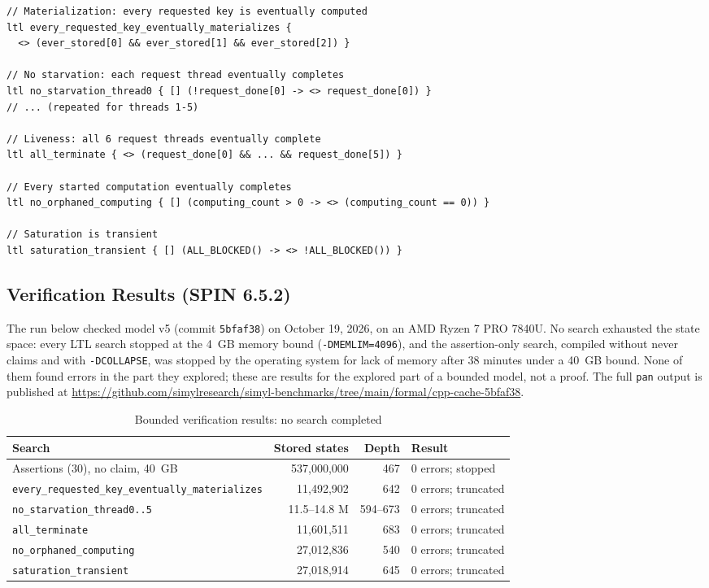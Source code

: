 \documentclass[11pt,a4paper]{article}
\begin{document}
\begin{lstlisting}[language=Promela, caption=LTL properties checked under weak fairness]
// Materialization: every requested key is eventually computed
ltl every_requested_key_eventually_materializes {
  <> (ever_stored[0] && ever_stored[1] && ever_stored[2]) }

// No starvation: each request thread eventually completes
ltl no_starvation_thread0 { [] (!request_done[0] -> <> request_done[0]) }
// ... (repeated for threads 1-5)

// Liveness: all 6 request threads eventually complete
ltl all_terminate { <> (request_done[0] && ... && request_done[5]) }

// Every started computation eventually completes
ltl no_orphaned_computing { [] (computing_count > 0 -> <> (computing_count == 0)) }

// Saturation is transient
ltl saturation_transient { [] (ALL_BLOCKED() -> <> !ALL_BLOCKED()) }
\end{lstlisting}

\subsection{Verification Results (SPIN 6.5.2)}

The run below checked model v5 (commit \texttt{5bfaf38}) on October 19, 2026,
on an AMD Ryzen 7 PRO 7840U. No search exhausted the state space: every LTL
search stopped at the 4~GB memory bound (\texttt{-DMEMLIM=4096}), and the
assertion-only search, compiled without never claims and with
\texttt{-DCOLLAPSE}, was stopped by the operating system for lack of memory
after 38 minutes under a 40~GB bound. None of them found errors in the part
they explored; these are results for the explored part of a bounded model,
not a proof. The full \texttt{pan} output is published at
\url{https://github.com/simylresearch/simyl-benchmarks/tree/main/formal/cpp-cache-5bfaf38}.

\begin{table}[htbp]
\centering
\small
\begin{tabular}{@{}lrrl@{}}
\toprule
Search & Stored states & Depth & Result \\
\midrule
Assertions (30), no claim, 40~GB & 537,000,000 & 467 & 0 errors; stopped \\
\texttt{every\_requested\_key\_eventually\_materializes} & 11,492,902 & 642 & 0 errors; truncated \\
\texttt{no\_starvation\_thread0..5} & 11.5--14.8 M & 594--673 & 0 errors; truncated \\
\texttt{all\_terminate} & 11,601,511 & 683 & 0 errors; truncated \\
\texttt{no\_orphaned\_computing} & 27,012,836 & 540 & 0 errors; truncated \\
\texttt{saturation\_transient} & 27,018,914 & 645 & 0 errors; truncated \\
\bottomrule
\end{tabular}
\caption{Bounded verification results: no search completed}
\end{table}
\end{document}
